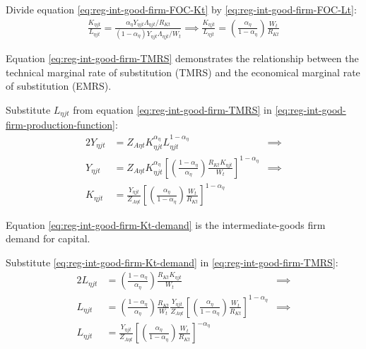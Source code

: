 \documentclass[
thesis.tex
]{subfiles}
\begin{document}
Divide equation \ref{eq:reg-int-good-firm-FOC-Kt} by \ref{eq:reg-int-good-firm-FOC-Lt}:
\begin{align}
	\frac{K_{\eta jt}}{L_{\eta jt}} = \frac{{\alpha_{\eta}} Y_{\eta jt} \Lambda_{\eta jt} /R_{Kt}}{(1-{\alpha_{\eta}}) Y_{\eta jt} \Lambda_{\eta jt} /W_t} \implies
	\frac{K_{\eta jt}}{L_{\eta jt}} = \left( \frac{{\alpha_{\eta}}}{1-{\alpha_{\eta}}} \right) \frac{W_t}{R_{Kt}} \label{eq:reg-int-good-firm-TMRS}
\end{align}

Equation \ref{eq:reg-int-good-firm-TMRS} demonstrates the relationship between the technical marginal rate of substitution (TMRS) and the economical marginal rate of substitution (EMRS). 

Substitute $L_{\eta jt}$ from equation \ref{eq:reg-int-good-firm-TMRS} in \ref{eq:reg-int-good-firm-production-function}:
\begin{alignat}{2}
	Y_{\eta jt} & = Z_{A\eta t} K_{\eta jt}^{\alpha_{\eta}} L_{\eta jt}^{1-{\alpha_{\eta}}} &\implies \nonumber \\
	Y_{\eta jt} & = Z_{A\eta t} K_{\eta jt}^{\alpha_{\eta}} \left[ \left( \frac{1-{\alpha_{\eta}}}{{\alpha_{\eta}}} \right) \frac{R_{Kt} K_{\eta jt}}{W_t} \right]^{1-{\alpha_{\eta}}} &\implies \nonumber \\
	K_{\eta jt} & = \frac{Y_{\eta jt}}{Z_{A\eta t}} \left[ \left( \frac{{\alpha_{\eta}}}{1-{\alpha_{\eta}}} \right) \frac{W_t}{R_{Kt}}\right]^{1-{\alpha_{\eta}}} \label{eq:reg-int-good-firm-Kt-demand}
\end{alignat}

Equation \ref{eq:reg-int-good-firm-Kt-demand} is the intermediate-goods firm demand for capital. 

Substitute \ref{eq:reg-int-good-firm-Kt-demand} in \ref{eq:reg-int-good-firm-TMRS}:
\begin{alignat}{2}
	L_{\eta jt} & = \left( \frac{1-{\alpha_{\eta}}}{{\alpha_{\eta}}} \right) \frac{R_{Kt} K_{\eta jt}}{W_t} &\implies \nonumber \\
	L_{\eta jt} & = \left( \frac{1-{\alpha_{\eta}}}{{\alpha_{\eta}}} \right) \frac{R_{Kt}}{W_t} \frac{Y_{\eta jt}}{Z_{A\eta t}} \left[ \left( \frac{{\alpha_{\eta}}}{1-{\alpha_{\eta}}} \right) \frac{W_t}{R_{Kt}}\right]^{1-{\alpha_{\eta}}} &\implies \nonumber \\
	L_{\eta jt} & = \frac{Y_{\eta jt}}{Z_{A\eta t}} \left[ \left( \frac{{\alpha_{\eta}}}{1-{\alpha_{\eta}}} \right) \frac{W_t}{R_{Kt}}\right]^{-{\alpha_{\eta}}} \label{eq:reg-int-good-firm-Lt-demand}
\end{alignat}
\end{document}
